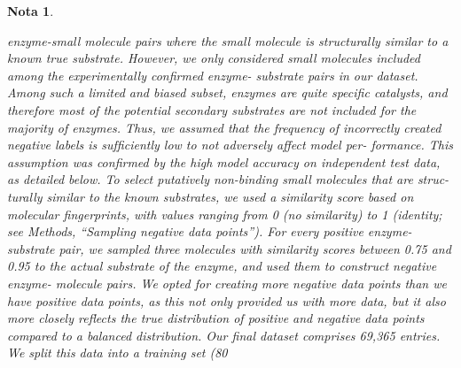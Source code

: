 \documentclass[12pt]{article}
\newtheorem{Note}{Nota}%
\begin{document}
\begin{Note}
\begin{itemize}
enzyme-small molecule pairs where the small molecule is structurally
similar to a known true substrate. However, we only considered small
molecules included among the experimentally conﬁrmed enzyme-
substrate pairs in our dataset. Among such a limited and biased subset,
enzymes are quite speciﬁc catalysts, and therefore most of the
potential secondary substrates are not included for the majority of
enzymes. Thus, we assumed that the frequency of incorrectly created
negative labels is sufﬁciently low to not adversely affect model per-
formance. This assumption was conﬁrmed by the high model accuracy
on independent test data, as detailed below.
To select putatively non-binding small molecules that are struc-
turally similar to the known substrates, we used a similarity score
based on molecular ﬁngerprints, with values ranging from 0 (no
similarity) to 1 (identity; see Methods, “Sampling negative data
points”). For every positive enzyme-substrate pair, we sampled three
molecules with similarity scores between 0.75 and 0.95 to the actual
substrate of the enzyme, and used them to construct negative enzyme-
molecule pairs. We opted for creating more negative data points than
we have positive data points, as this not only provided us with more
data, but it also more closely reﬂects the true distribution of positive
and negative data points compared to a balanced distribution.
Our ﬁnal dataset comprises 69,365 entries. We split this data into a
training set (80%


\end{itemize}
\end{Note}
\end{document}
